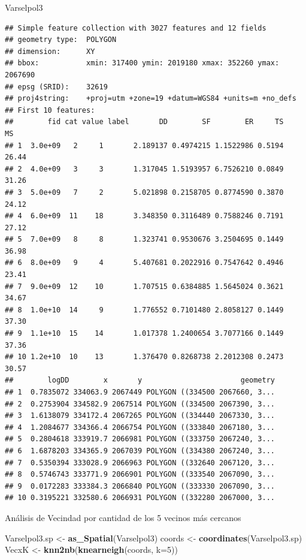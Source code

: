 \documentclass[11pt,]{article}
\newenvironment{Shaded}{\begin{snugshade}}{\end{snugshade}}
\newcommand{\KeywordTok}[1]{\textcolor[rgb]{0.13,0.29,0.53}{\textbf{#1}}}
\newcommand{\DataTypeTok}[1]{\textcolor[rgb]{0.13,0.29,0.53}{#1}}
\newcommand{\DecValTok}[1]{\textcolor[rgb]{0.00,0.00,0.81}{#1}}
\newcommand{\StringTok}[1]{\textcolor[rgb]{0.31,0.60,0.02}{#1}}
\newcommand{\NormalTok}[1]{#1}
\begin{document}
\begin{Shaded}
\begin{Highlighting}[]
\NormalTok{Varselpol3}
\end{Highlighting}
\end{Shaded}

\begin{verbatim}
## Simple feature collection with 3027 features and 12 fields
## geometry type:  POLYGON
## dimension:      XY
## bbox:           xmin: 317400 ymin: 2019180 xmax: 352260 ymax: 2067690
## epsg (SRID):    32619
## proj4string:    +proj=utm +zone=19 +datum=WGS84 +units=m +no_defs
## First 10 features:
##        fid cat value label       DD        SF        ER     TS    MS
## 1  3.0e+09   2     1       2.189137 0.4974215 1.1522986 0.5194 26.44
## 2  4.0e+09   3     3       1.317045 1.5193957 6.7526210 0.0849 31.26
## 3  5.0e+09   7     2       5.021898 0.2158705 0.8774590 0.3870 24.12
## 4  6.0e+09  11    18       3.348350 0.3116489 0.7588246 0.7191 27.12
## 5  7.0e+09   8     8       1.323741 0.9530676 3.2504695 0.1449 36.98
## 6  8.0e+09   9     4       5.407681 0.2022916 0.7547642 0.4946 23.41
## 7  9.0e+09  12    10       1.707515 0.6384885 1.5645024 0.3621 34.67
## 8  1.0e+10  14     9       1.776552 0.7101480 2.8058127 0.1449 37.30
## 9  1.1e+10  15    14       1.017378 1.2400654 3.7077166 0.1449 37.36
## 10 1.2e+10  10    13       1.376470 0.8268738 2.2012308 0.2473 30.57
##        logDD        x       y                       geometry
## 1  0.7835072 334063.9 2067449 POLYGON ((334500 2067660, 3...
## 2  0.2753904 334582.9 2067514 POLYGON ((334500 2067390, 3...
## 3  1.6138079 334172.4 2067265 POLYGON ((334440 2067330, 3...
## 4  1.2084677 334366.4 2066754 POLYGON ((333840 2067180, 3...
## 5  0.2804618 333919.7 2066981 POLYGON ((333750 2067240, 3...
## 6  1.6878203 334365.9 2067039 POLYGON ((334380 2067240, 3...
## 7  0.5350394 333028.9 2066963 POLYGON ((332640 2067120, 3...
## 8  0.5746743 333771.9 2066901 POLYGON ((333540 2067090, 3...
## 9  0.0172283 333384.3 2066840 POLYGON ((333330 2067090, 3...
## 10 0.3195221 332580.6 2066931 POLYGON ((332280 2067000, 3...
\end{verbatim}

Análisis de Vecindad por cantidad de los 5 vecinos más cercanos

\begin{Shaded}
\begin{Highlighting}[]
\NormalTok{Varselpol3.sp <-}\StringTok{ }\KeywordTok{as_Spatial}\NormalTok{(Varselpol3)}
\NormalTok{coords <-}\StringTok{ }\KeywordTok{coordinates}\NormalTok{(Varselpol3.sp)}
\NormalTok{VecxK <-}\StringTok{ }\KeywordTok{knn2nb}\NormalTok{(}\KeywordTok{knearneigh}\NormalTok{(coords, }\DataTypeTok{k=}\DecValTok{5}\NormalTok{))}
\end{Highlighting}
\end{Shaded}
\end{document}
